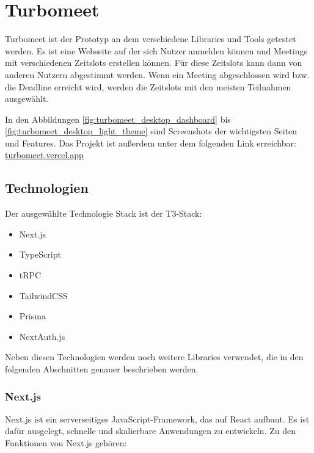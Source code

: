 \chapter{Turbomeet}
\label{Turbomeet}

Turbomeet ist der Prototyp an dem verschiedene Libraries und Tools getestet werden. Es ist eine Webseite auf der sich Nutzer anmelden können und Meetings mit verschiedenen Zeitslots erstellen können. Für diese Zeitslots kann dann von anderen Nutzern abgestimmt werden. Wenn ein Meeting abgeschlossen wird bzw. die Deadline erreicht wird, werden die Zeitslots mit den meisten Teilnahmen ausgewählt.

In den Abbildungen \ref{fig:turbomeet_desktop_dashboard} bis \ref{fig:turbomeet_desktop_light_theme} sind Screenshots der wichtigsten Seiten und Features. Das Projekt ist außerdem unter dem folgenden Link erreichbar: \href{https://turbomeet.vercel.app/}{turbomeet.vercel.app}

\section{Technologien}
\label{Technologies}

Der ausgewählte Technologie Stack ist der T3-Stack:

\begin{itemize}
    \item Next.js
    \item TypeScript
    \item tRPC
    \item TailwindCSS
    \item Prisma
    \item NextAuth.js
\end{itemize}

Neben diesen Technologien werden noch weitere Libraries verwendet, die in den folgenden Abschnitten genauer beschrieben werden.

\subsection{Next.js}

Next.js ist ein serverseitiges JavaScript-Framework, das auf React aufbaut. Es ist dafür ausgelegt, schnelle und skalierbare Anwendungen zu entwickeln. Zu den Funktionen von Next.js gehören:

